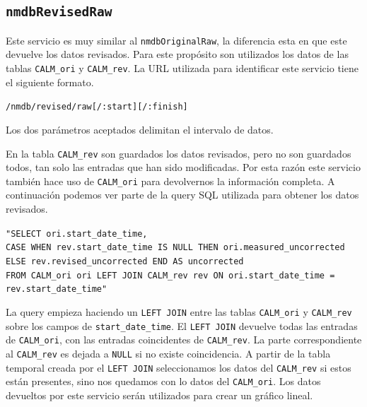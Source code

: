 	\subsection{\texttt{nmdbRevisedRaw}}
		Este servicio es muy similar al \texttt{nmdbOriginalRaw}, la diferencia esta en que este devuelve los datos revisados. Para este
		propósito son utilizados los datos de las tablas \texttt{CALM\_ori} y \texttt{CALM\_rev}. La URL utilizada para identificar este
		servicio tiene el siguiente formato.
	  		\begin{center} \texttt{/nmdb/revised/raw[/:start][/:finish]}  \end{center} 
		Los dos parámetros aceptados delimitan el intervalo de datos.
		\par
		En la tabla \texttt{CALM\_rev} son guardados los datos revisados, pero no son guardados todos, tan solo las entradas que han sido modificadas.
		Por esta razón este servicio también hace uso de \texttt{CALM\_ori} para devolvernos la información completa. A continuación podemos
		ver parte de la query SQL utilizada para obtener los datos revisados.
			\begin{center} \texttt{"SELECT ori.start\_date\_time,
			  		\\	CASE WHEN rev.start\_date\_time IS NULL THEN ori.measured\_uncorrected ELSE rev.revised\_uncorrected END AS uncorrected 
					\\	FROM CALM\_ori ori LEFT JOIN CALM\_rev rev ON ori.start\_date\_time = rev.start\_date\_time"}
			\end{center} 
		La query empieza haciendo un \texttt{LEFT JOIN} entre las tablas \texttt{CALM\_ori} y \texttt{CALM\_rev} sobre los campos de
		\texttt{start\_date\_time}. El \texttt{LEFT JOIN} devuelve todas las entradas de \texttt{CALM\_ori}, con las entradas coincidentes de
		\texttt{CALM\_rev}. La parte correspondiente al \texttt{CALM\_rev} es dejada a \texttt{NULL} si no existe coincidencia. A partir de la
		tabla temporal creada por el \texttt{LEFT JOIN} seleccionamos los datos del \texttt{CALM\_rev} si estos están presentes, sino nos
		quedamos con lo datos del \texttt{CALM\_ori}. Los datos devueltos por este servicio serán utilizados para crear un gráfico lineal.
